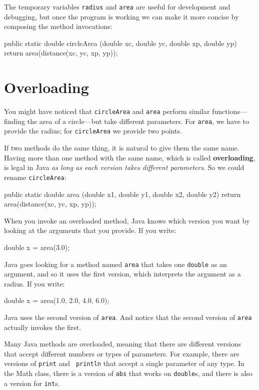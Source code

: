 The temporary variables {\tt radius} and {\tt area} are
useful for development and debugging, but once the program is
working we can make it more concise by composing
the method invocations:

\begin{code}
  public static double circleArea
              (double xc, double yc, double xp, double yp) {
    return area(distance(xc, yc, xp, yp));
  }
\end{code}


\section{Overloading}
\label{overloading}

You might have noticed that {\tt circleArea}
and {\tt area} perform similar functions---finding
the area of a circle---but take different parameters.  For
{\tt area}, we have to provide the radius; for {\tt circleArea}
we provide two points.

If two methods do the same thing, it is natural to give them
the same name.
Having more than one method with the same name, which is called {\bf
overloading}, is legal in Java {\em as long as each version takes
different parameters}.  So we could rename {\tt circleArea}:

\begin{code}
  public static double area
              (double x1, double y1, double x2, double y2) {
    return area(distance(xc, yc, xp, yp));
  }
\end{code}

When you invoke an overloaded method, Java knows which version you
want by looking at the arguments that you provide.  If you write:

\begin{code}
    double x = area(3.0);
\end{code}

Java goes looking for a method named {\tt area} that
takes one {\tt double} as an argument, and so it uses the
first version, which interprets the argument as a radius.
If you write:

\begin{code}
    double x = area(1.0, 2.0, 4.0, 6.0);
\end{code}

Java uses the second version of {\tt area}.  And notice that the
second version of {\tt area} actually invokes the first.

Many Java methods are overloaded, meaning that there
are different versions that accept different numbers or types of
parameters.  For example, there are versions of {\tt print} and {\tt
println} that accept a single parameter of any type.  In the Math
class, there is a version of {\tt abs} that works on {\tt double}s,
and there is also a version for {\tt int}s.

